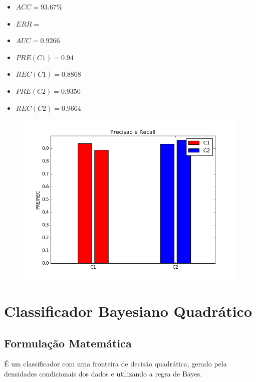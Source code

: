 \documentclass[11pt,a4paper]{article}
\numberwithin{equation}{section}
\begin{document}
\begin{minipage}{.5\textwidth}
\begin{itemize}
\item $ACC = 93.67 \%$
\item $ERR =  $
\item $AUC = 0.9266 $
\item $PRE(C1) = 0.94$
\item $REC(C1) = 0.8868$
\item $PRE(C2) = 0.9350$
\item $REC(C2) = 0.9664$
\end{itemize}
\end{minipage}%
\begin{minipage}{.5\textwidth}
\begin{figure}[H]
\centering
  \includegraphics[width=\linewidth]{../img/naive_bayes_rec.png}
  \label{fig:percep}
\end{figure}
\end{minipage}%


\section{Classificador Bayesiano Quadrático}
\subsection{Formulação Matemática}
É um classificador com uma fronteira de decisão quadrática, gerado pela densidades condicionais dos dados e utilizando a regra de Bayes.
\end{document}
